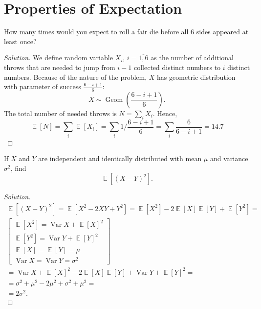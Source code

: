 \documentclass{article}[12pt]
\newenvironment{solution}
  {\renewcommand\qedsymbol{$\blacksquare$}\begin{proof}[Solution]}
  {\end{proof}}
\newenvironment{problem}[1]
  {\renewcommand\theinnercustomprblm{#1}\innercustomprblm}
  {\endinnercustomprblm}
\DeclareMathOperator{\Var}{Var}
\DeclareMathOperator{\Geo}{Geom}
\DeclareMathOperator{\E}{\mathbb{E}}
\begin{document}
\newpage

\section{Properties of Expectation}

\begin{problem}{7.22}
How many times would you expect to roll a fair die before all $6$ sides appeared at least once?
\end{problem}
\begin{solution}
We define random variable $X_i$, $i=\overline{1,6}$ as the number of additional throws that are needed to jump from $i-1$ collected distinct numbers to $i$ distinct numbers.
Because of the nature of the problem, $X$ has geometric distribution with parameter of success $\frac{6 - i + 1}{6}$:
\begin{equation*}
    X\sim\Geo\left(\frac{6 - i + 1}{6}\right).
\end{equation*}
The total number of needed throws is $N = \sum_{i}X_{i}$.
Hence,
\begin{equation*}
    \E[N] = \sum_{i}\E[X_{i}] = \sum_{i}1\Big/\frac{6 - i + 1}{6} = \sum_{i}\frac{6}{6 - i + 1} = 14.7
\end{equation*}
\end{solution}

\begin{problem}{7.30}
If $X$ and $Y$ are independent and identically distributed with mean $\mu$ and variance $\sigma^{2}$, find
\begin{equation*}
    \E\left[(X - Y)^{2}\right].
\end{equation*}
\end{problem}
\begin{solution}
\begin{gather*}
    \E\left[(X - Y)^{2}\right] = \E[X^{2} - 2XY + Y^{2}] = \E[X^{2}] - 2\E[X]\E[Y] + \E[Y^{2}] =
    \\
    \begin{bmatrix}
        \E[X^{2}] = \Var X + \E[X]^{2} 
        \\
        \E[Y^{2}] = \Var Y + \E[Y]^{2}
        \\
        \E[X] = \E[Y] = \mu
        \\
        \Var X = \Var Y = \sigma^{2}
    \end{bmatrix}
    \\
    = \Var X + \E[X]^{2} - 2\E[X]\E[Y] + \Var Y + \E[Y]^{2} =
    \\
    = \sigma^{2} + \mu^{2} - 2\mu^{2} + \sigma^{2} + \mu^{2} =
    \\
    = 2\sigma^{2}.
\end{gather*}
\end{solution}
\end{document}
